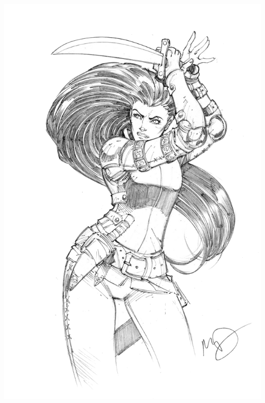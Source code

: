 \begin{multicols*}{2}
\begin{Figure}
\centering
\includegraphics[width=\textwidth]{img/rogue-2.png}
\end{Figure}
    
\end{multicols*}